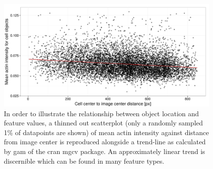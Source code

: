 \begin{knitrout}
\color{fgcolor}\begin{figure}

{\centering \includegraphics[width=.95\linewidth]{figures/R/location-trends-data-location-trend-1} 

}

\caption[Scatterplot visualization showing mean actin intensity against object distance from image center alongside a trend line.]{In order to illustrate the relationship between object location and feature values, a thinned out scatterplot (only a randomly sampled 1\% of datapoints are shown) of mean actin intensity against distance from image center is reproduced alongside a trend-line as calculated by gam of the \acrshort{cran} mgcv package. An approximately linear trend is discernible which can be found in many feature types.}\label{fig:data-location-trend}
\end{figure}


\end{knitrout}
